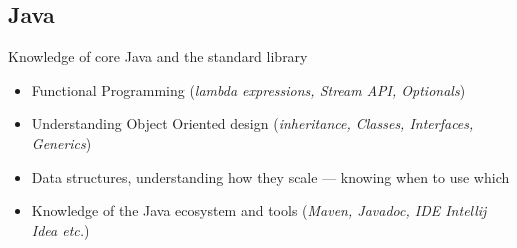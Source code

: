 \documentclass[a4paper, 13pt, draft]{article}
\newcommand{\proglang}[1]{%
    \subsection*{#1}
}
\begin{document}
\proglang{Java}

Knowledge of core Java and the standard library

\begin{itemize}
    \setlength\itemsep{0em}
\item
    Functional Programming (\textit{lambda expressions, Stream API, Optionals})
\item
    Understanding Object Oriented design (\textit{inheritance, Classes, Interfaces, Generics})
\item
    Data structures, understanding how they scale --- knowing when to use which
\item
    Knowledge of the Java ecosystem and tools (\textit{Maven, Javadoc, IDE Intellij Idea etc.})
\end{itemize}

\pagebreak
\end{document}
